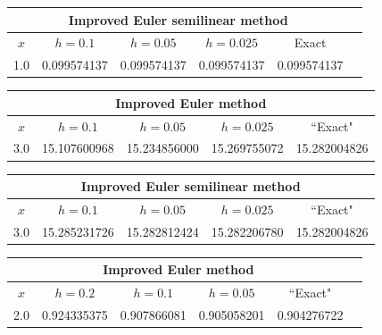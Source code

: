 \bigskip
\hspace{.75in}
{\small
\begin{tabular}{|c|r|r|r|r|r|}
\hline
\multicolumn{5}{|c|}{Improved Euler semilinear method}\\\hline
\multicolumn{1}{|c|}{$x$}&
\multicolumn{1}{|c|}{$h=0.1$}&
\multicolumn{1}{|c|}{$h=0.05$}&
\multicolumn{1}{|c|}{$h=0.025$}&
\multicolumn{1}{|c|}{Exact}\\ \hline
1.0 & 0.099574137 & 0.099574137 &0.099574137  &0.099574137  \\
\hline
\end{tabular}}

\bigskip

{\small
\begin{tabular}{|c|r|r|r|r|}
\hline
\multicolumn{5}{|c|}{Improved Euler method}\\\hline
\multicolumn{1}{|c|}{$x$}&
\multicolumn{1}{|c|}{$h=0.1$}&
\multicolumn{1}{|c|}{$h=0.05$}&
\multicolumn{1}{|c|}{$h=0.025$}&
\multicolumn{1}{|c|}{``Exact"}\\ \hline
3.0 & 15.107600968 & 15.234856000 & 15.269755072 & 15.282004826 \\
\hline
\end{tabular}}

\bigskip

\hspace{.75in}
{\small
\begin{tabular}{|c|r|r|r|r|}
\hline
\multicolumn{5}{|c|}{Improved Euler semilinear method}\\\hline
\multicolumn{1}{|c|}{$x$}&
\multicolumn{1}{|c|}{$h=0.1$}&
\multicolumn{1}{|c|}{$h=0.05$}&
\multicolumn{1}{|c|}{$h=0.025$}&
\multicolumn{1}{|c|}{``Exact"}\\ \hline
3.0 & 15.285231726 & 15.282812424 & 15.282206780 & 15.282004826 \\
\hline
\end{tabular}}

\bigskip

{\small
\begin{tabular}{|c|r|r|r|r|r|}
\hline
\multicolumn{5}{|c|}{Improved Euler method}\\\hline
\multicolumn{1}{|c|}{$x$}&
\multicolumn{1}{|c|}{$h=0.2$}&
\multicolumn{1}{|c|}{$h=0.1$}&
\multicolumn{1}{|c|}{$h=0.05$}&
\multicolumn{1}{|c|}{``Exact"}\\ \hline
2.0 & 0.924335375 & 0.907866081 & 0.905058201 & 0.904276722 \\
\hline
\end{tabular}}

